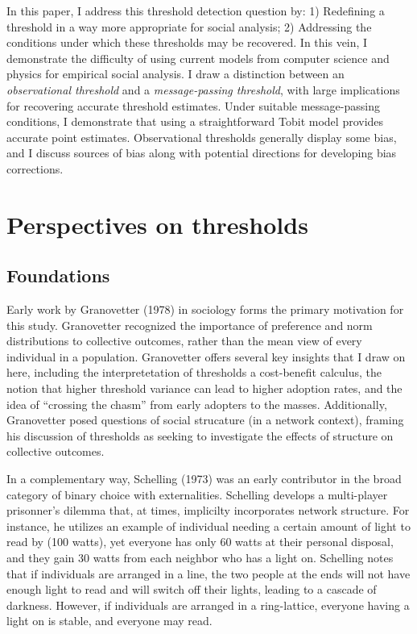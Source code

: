 \documentclass{article}
\begin{document}
In this paper, I address this threshold detection question by: 1) Redefining a threshold in a way more appropriate for social analysis; 2) Addressing the conditions under which these thresholds may be recovered. In this vein, I demonstrate the difficulty of using current models from computer science and physics for empirical social analysis. I draw a distinction between an \emph{observational threshold} and a \emph{message-passing threshold}, with large implications for recovering accurate threshold estimates. Under suitable message-passing conditions, I demonstrate that using a straightforward Tobit model provides accurate point estimates. Observational thresholds generally display some bias, and I discuss sources of bias along with potential directions for developing bias corrections.

\section{Perspectives on thresholds}

\subsection{Foundations}

Early work by Granovetter (1978) in sociology forms the primary motivation for this study. Granovetter recognized the importance of preference and norm distributions to collective outcomes, rather than the mean view of every individual in a population. Granovetter offers several key insights that I draw on here, including the interpretetation of thresholds a cost-benefit calculus, the notion that higher threshold variance can lead to higher adoption rates, and the idea of ``crossing the chasm'' from early adopters to the masses. Additionally, Granovetter posed questions of social strucature (in a network context), framing his discussion of thresholds as seeking to investigate the effects of structure on collective outcomes.

In a complementary way, Schelling (1973) was an early contributor in the broad category of binary choice with externalities. Schelling develops a multi-player prisonner's dilemma that, at times, implicilty incorporates network structure. For instance, he utilizes an example of individual needing a certain amount of light to read by (100 watts), yet everyone has only 60 watts at their personal disposal, and they gain 30 watts from each neighbor who has a light on. Schelling notes that if individuals are arranged in a line, the two people at the ends will not have enough light to read and will switch off their lights, leading to a cascade of darkness. However, if individuals are arranged in a ring-lattice, everyone having a light on is stable, and everyone may read.
\end{document}
